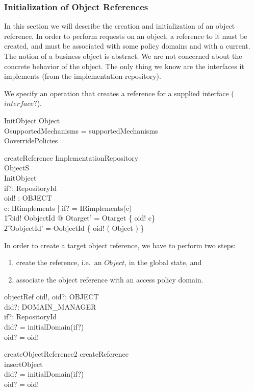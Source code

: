 \subsubsection{Initialization of Object References}

In this section we will describe the creation and initialization of an object
reference.  In order to perform requests on an object, a reference to it must be
created, and must be associated with some policy domains and with a current. The
notion of a business object is abstract. We are not concerned about the concrete
behavior of the object. The only thing we know are the interfaces it implements
(from the implementation repository).

We specify an operation that creates a reference for a supplied interface
($interface?$). 
\begin{schema}{InitObject}
  Object \\
  \where
  OsupportedMechanisms = supportedMechanisms \\
  OoverridePolicies = \emptyset \\
\end{schema}
\begin{schema}{createReference}
  \Xi ImplementationRepository \\
  \Delta ObjectS \\
  InitObject \\
  if?: RepositoryId \\
  oid! : OBJECT \\
  \where
  \exists c: \dom IRimplements | if? = IRimplements(c) \land \\
  \t1 oid! \notin \dom OobjectId @ Otarget' = Otarget \cup \{ oid! \mapsto c\} \\
  \t2 \land OobjectId' = OobjectId \cup \{ oid! \mapsto ( \theta Object ) \} \\
\end{schema}
In order to create a target object reference, we have to perform two steps:
\begin{enumerate}
\item create the reference, i.e.\ an $Object$, in the global state, and
\item associate the object reference with an access policy domain.
\end{enumerate}
\begin{zedgroup}
\begin{schema}{objectRef}
  oid!, oid?: OBJECT \\
  did?: DOMAIN\_MANAGER \\
  if?: RepositoryId \\
  \where
  did? = initialDomain(if?) \\
  oid? = oid! \\
\end{schema}
\begin{schema}{createObjectReference2}
  createReference \\
  insertObject \\
  \where
  did? = initialDomain(if?) \\
  oid? = oid! \\
\end{schema}
\end{zedgroup}
